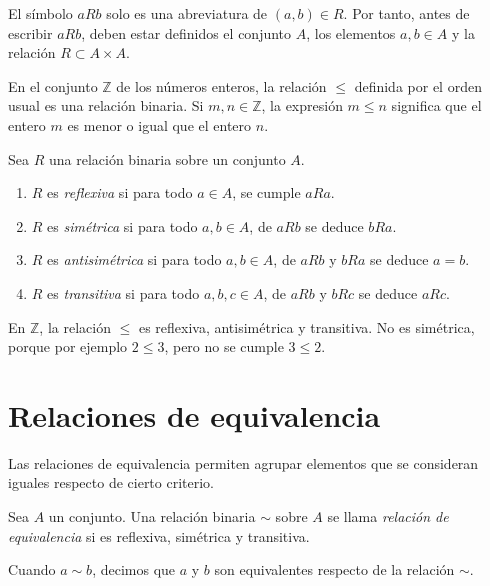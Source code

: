 El símbolo \(aRb\) solo es una abreviatura de \((a,b)\in R\). Por tanto, antes de escribir \(aRb\), deben estar definidos el conjunto \(A\), los elementos \(a,b\in A\) y la relación \(R\subset A\times A\).

\begin{ejemplo}
En el conjunto \(\mathbb{Z}\) de los números enteros, la relación \(\leq\) definida por el orden usual es una relación binaria. Si \(m,n\in\mathbb{Z}\), la expresión \(m\leq n\) significa que el entero \(m\) es menor o igual que el entero \(n\).
\end{ejemplo}

\begin{definicion}
Sea \(R\) una relación binaria sobre un conjunto \(A\).
\begin{enumerate}
  \item \(R\) es \emph{reflexiva} si para todo \(a\in A\), se cumple \(aRa\).
  \item \(R\) es \emph{simétrica} si para todo \(a,b\in A\), de \(aRb\) se deduce \(bRa\).
  \item \(R\) es \emph{antisimétrica} si para todo \(a,b\in A\), de \(aRb\) y \(bRa\) se deduce \(a=b\).
  \item \(R\) es \emph{transitiva} si para todo \(a,b,c\in A\), de \(aRb\) y \(bRc\) se deduce \(aRc\).
\end{enumerate}
\end{definicion}

\begin{ejemplo}
En \(\mathbb{Z}\), la relación \(\leq\) es reflexiva, antisimétrica y transitiva. No es simétrica, porque por ejemplo \(2\leq 3\), pero no se cumple \(3\leq 2\).
\end{ejemplo}

\section{Relaciones de equivalencia}

Las relaciones de equivalencia permiten agrupar elementos que se consideran iguales respecto de cierto criterio.

\begin{definicion}
Sea \(A\) un conjunto. Una relación binaria \(\sim\) sobre \(A\) se llama \emph{relación de equivalencia} si es reflexiva, simétrica y transitiva.
\end{definicion}

Cuando \(a\sim b\), decimos que \(a\) y \(b\) son equivalentes respecto de la relación \(\sim\).


